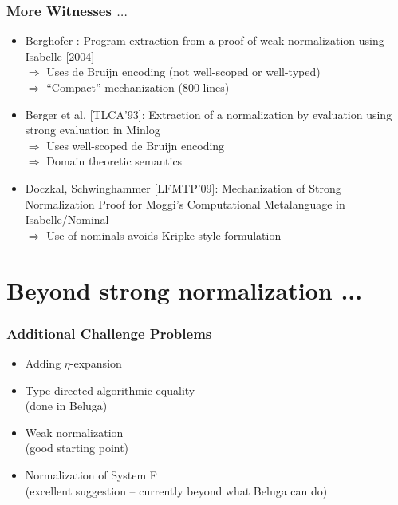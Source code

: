 \documentclass{beamer}
\begin{document}
\begin{frame}
  \frametitle{More Witnesses $\ldots$}

  \begin{itemize}
  \item Berghofer : Program extraction from a proof of weak
    normalization using Isabelle [2004]
\\
$\Longrightarrow$ Uses de Bruijn encoding (not well-scoped or
well-typed)\\
$\Longrightarrow$ ``Compact'' mechanization (800 lines)
\\[1em]
\pause
\item Berger et al. [TLCA'93]: Extraction of a normalization by
  evaluation using strong evaluation in Minlog\\
$\Longrightarrow$ Uses well-scoped de Bruijn encoding \\%
$\Longrightarrow$ Domain theoretic semantics
\\[1em]
\pause
\item Doczkal, Schwinghammer [LFMTP'09]:
Mechanization of Strong Normalization Proof for Moggi’s Computational
Metalanguage in Isabelle/Nominal\\
$\Longrightarrow$ Use of nominals avoids Kripke-style formulation
\end{itemize}
\end{frame}


\section{Beyond strong normalization ...}


\begin{frame}
  \frametitle{Additional Challenge Problems}
  \begin{itemize}
  \item Adding $\eta$-expansion

  \item Type-directed algorithmic equality\\
(done in Beluga)

  \item Weak normalization \\
  (good starting point)

  \item Normalization of System F \\
   (excellent suggestion -- currently beyond what Beluga can do)
  \end{itemize}

\end{frame}
\end{document}
